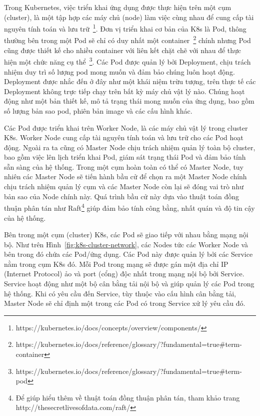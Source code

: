 Trong Kubernetes, việc triển khai ứng dụng được thực hiện trên một cụm (cluster), là một tập hợp các máy chủ (node) làm việc cùng nhau để cung cấp tài nguyên tính toán và lưu trữ~\footnote{https://kubernetes.io/docs/concepts/overview/components/}.
Đơn vị triển khai cơ bản của K8s là Pod, thông thường bên trong một Pod sẽ chỉ có duy nhất một container~\footnote{https://kubernetes.io/docs/reference/glossary/?fundamental=true\#term-container} chính nhưng Pod cũng được thiết kế cho nhiều container với liên kết chặt chẽ với nhau để thực hiện một chức năng cụ thể~\footnote{https://kubernetes.io/docs/reference/glossary/?fundamental=true\#term-pod}.
Các Pod được quản lý bởi Deployment, chịu trách nhiệm duy trì số lượng pod mong muốn và đảm bảo chúng luôn hoạt động.
Deployment được nhắc đến ở đây như một khái niệm trừu tượng, trên thực tế các Deployment không trực tiếp chạy trên bất kỳ máy chủ vật lý nào.
Chúng hoạt động như một bản thiết kế, mô tả trạng thái mong muốn của ứng dụng, bao gồm số lượng bản sao pod, phiên bản image và các cấu hình khác.

Các Pod được triển khai trên Worker Node, là các máy chủ vật lý trong cluster K8s.
Worker Node cung cấp tài nguyên tính toán và lưu trữ cho các Pod hoạt động.
Ngoài ra ta cũng có Master Node chịu trách nhiệm quản lý toàn bộ cluster, bao gồm việc lên lịch triển khai Pod, giám sát trạng thái Pod và đảm bảo tính sẵn sàng của hệ thống.
Trong một cụm hoàn toàn có thể có Master Node, tuy nhiên các Master Node sẽ tiến hành bầu cử để chọn ra một Master Node chính chịu trách nhiệm quản lý cụm và các Master Node còn lại sẽ đóng vai trò như bản sao của Node chính này.
Quá trình bầu cử này dựa vào thuật toán đồng thuận phân tán như Raft\footnote{Để giúp hiểu thêm về thuật toán đồng thuận phân tán, tham khảo trang http://thesecretlivesofdata.com/raft/} giúp đảm bảo tính công bằng, nhất quán và độ tin cậy của hệ thống.

Bên trong một cụm (cluster) K8s, các Pod sẽ giao tiếp với nhau bằng mạng nội bộ.
Như trên Hình~\ref{fig:k8s-cluster-network}, các Nodes tức các Worker Node và bên trong đó chứa các Pod/ứng dụng.
Các Pod này được quản lý bởi các Service nằm trong cụm K8s đó.
Mỗi Pod trong mạng sẽ được gán một địa chỉ IP (Internet Protocol) ảo và port (cổng) độc nhất trong mạng nội bộ bởi Service.
Service hoạt động như một bộ cân bằng tải nội bộ và giúp quản lý các Pod trong hệ thống.
Khi có yêu cầu đến Service, tùy thuộc vào cấu hình cân bằng tải, Master Node sẽ chỉ định một trong các Pod có trong Service xử lý yêu cầu đó.

